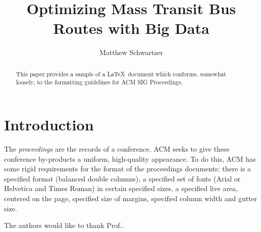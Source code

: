 \documentclass[sigconf]{acmart}
\begin{document}
\title{Optimizing Mass Transit Bus Routes with Big Data}


\author{Matthew Schwartzer}
\renewcommand{\shortauthors}{B. Trovato et al.}


\begin{abstract}
This paper provides a sample of a \LaTeX\ document which conforms,
somewhat loosely, to the formatting guidelines for
ACM SIG Proceedings.
\end{abstract}



\maketitle

\section{Introduction}

The \textit{proceedings} are the records of a
conference. ACM seeks to give these
conference by-products a uniform, high-quality appearance.  To do
this, ACM has some rigid requirements for the format of the
proceedings documents: there is a specified format (balanced double
columns), a specified set of fonts (Arial or Helvetica and Times
Roman) in certain specified sizes, a specified live area, centered on
the page, specified size of margins, specified column width and gutter
size\cite{Richly:01}.


\begin{acks}

  The authors would like to thank Prof..

\end{acks}


 
\end{document}
